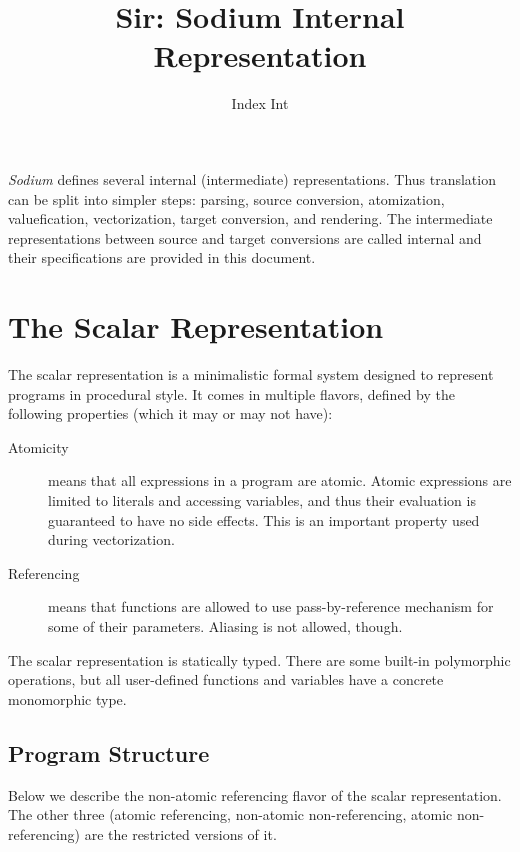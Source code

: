 \documentclass [a4paper] {article}
\title { Sir: Sodium Internal Representation }
\author { Index Int }
\begin{document}
\maketitle

\emph{Sodium} defines several internal (intermediate) representations. Thus
translation can be split into simpler steps: parsing, source conversion,
atomization, valuefication, vectorization, target conversion, and rendering. The
intermediate representations between source and target conversions are called
internal and their specifications are provided in this document.

\section { The Scalar Representation }

The scalar representation is a minimalistic formal system designed to represent
programs in procedural style. It comes in multiple flavors, defined by the
following properties (which it may or may not have):

\begin {description}

\item [Atomicity] means that all expressions in a program are atomic. Atomic
expressions are limited to literals and accessing variables, and thus their
evaluation is guaranteed to have no side effects. This is an important property
used during vectorization.

\item [Referencing] means that functions are allowed to use pass-by-reference
mechanism for some of their parameters. Aliasing is not allowed, though.

\end {description}

The scalar representation is statically typed. There are some built-in
polymorphic operations, but all user-defined functions and variables have a
concrete monomorphic type.

\subsection { Program Structure }

Below we describe the non-atomic referencing flavor of the scalar
representation. The other three (atomic referencing, non-atomic non-referencing,
atomic non-referencing) are the restricted versions of it.
\end{document}
